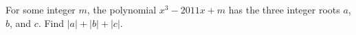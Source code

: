 For some integer $m$, the polynomial $x^3-2011x+m$ has the three integer roots $a$, $b$, and $c$. Find $|a|+|b|+|c|$.